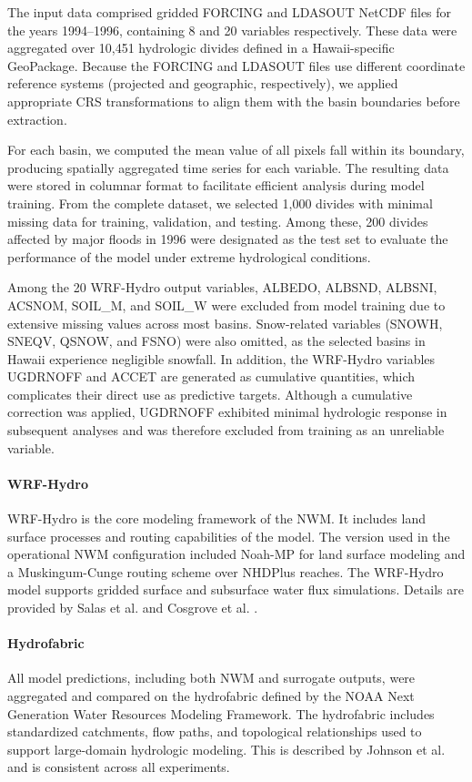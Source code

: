 \documentclass{article}
\begin{document}
The input data comprised gridded FORCING and LDASOUT NetCDF files for the years 1994–1996, containing 8 and 20 variables respectively. These data were aggregated over 10,451 hydrologic divides defined in a Hawaii-specific GeoPackage. Because the FORCING and LDASOUT files use different coordinate reference systems (projected and geographic, respectively), we applied appropriate CRS transformations to align them with the basin boundaries before extraction.

For each basin, we computed the mean value of all pixels fall within its boundary, producing spatially aggregated time series for each variable. The resulting data were stored in columnar format to facilitate efficient analysis during model training. From the complete dataset, we selected 1,000 divides with minimal missing data for training, validation, and testing. Among these, 200 divides affected by major floods in 1996 were designated as the test set to evaluate the performance of the model under extreme hydrological conditions.

Among the 20 WRF-Hydro output variables, ALBEDO, ALBSND, ALBSNI, ACSNOM, SOIL\_M, and SOIL\_W were excluded from model training due to extensive missing values across most basins. Snow-related variables (SNOWH, SNEQV, QSNOW, and FSNO) were also omitted, as the selected basins in Hawaii experience negligible snowfall. In addition, the WRF-Hydro variables UGDRNOFF and ACCET are generated as cumulative quantities, which complicates their direct use as predictive targets. Although a cumulative correction was applied, UGDRNOFF exhibited minimal hydrologic response in subsequent analyses and was therefore excluded from training as an unreliable variable.

\paragraph{WRF-Hydro}
WRF-Hydro is the core modeling framework of the NWM. It includes land surface processes and routing capabilities of the model. The version used in the operational NWM configuration included Noah-MP for land surface modeling and a Muskingum-Cunge routing scheme over NHDPlus reaches. The WRF-Hydro model supports gridded surface and subsurface water flux simulations. Details are provided by Salas et al. \cite{salas2018towards} and Cosgrove et al. \cite{cosgrove2024noaa}.

\paragraph{Hydrofabric}
All model predictions, including both NWM and surrogate outputs, were aggregated and compared on the hydrofabric defined by the NOAA Next Generation Water Resources Modeling Framework. The hydrofabric includes standardized catchments, flow paths, and topological relationships used to support large-domain hydrologic modeling. This is described by Johnson et al. \cite{johnson2022noaa} and is consistent across all experiments.
\end{document}

